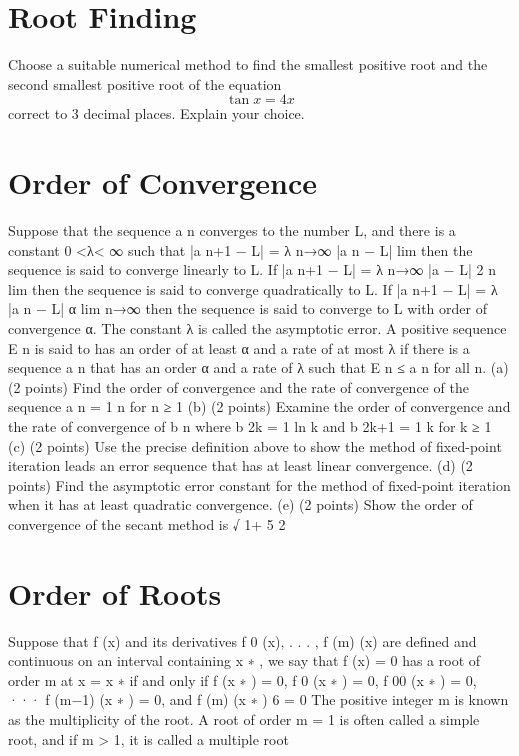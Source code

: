 \section{Root Finding}
Choose a suitable numerical method to find the smallest positive root and the second smallest positive root of the equation
\[ \tan x = 4x \]
correct to 3 decimal places.
Explain your choice.


\section{Order of Convergence}
Suppose that the sequence {a n } converges to the number L, and there is a constant
0 <λ< ∞
such that
|a n+1 − L|
= λ
n→∞ |a n − L|
lim
then the sequence is said to converge linearly to L. If
|a n+1 − L|
= λ
n→∞ |a − L| 2
n
lim
then the sequence is said to converge quadratically to L. If
|a n+1 − L|
= λ
|a n − L| α
lim
n→∞
then the sequence is said to converge to L with order of convergence α. The constant λ is
called the asymptotic error. A positive sequence {E n } is said to has an order of at least α
and a rate of at most λ if there is a sequence {a n } that has an order α and a rate of λ such
that
E n ≤ a n
for all n.
(a) (2 points) Find the order of convergence and the rate of convergence of the sequence
a n =
1
n
for
n ≥ 1
(b) (2 points) Examine the order of convergence and the rate of convergence of {b n } where
b 2k =
1
ln k
and
b 2k+1 =
1
k
for
k ≥ 1
(c) (2 points) Use the precise definition above to show the method of fixed-point iteration
leads an error sequence that has at least linear convergence.
(d) (2 points) Find the asymptotic error constant for the method of fixed-point iteration
when it has at least quadratic convergence.
(e) (2 points) Show the order of convergence of the secant method is
√
1+ 5
2


\section{Order of Roots}
Suppose that f (x) and its derivatives f 0 (x), . . . , f (m) (x) are defined and continuous on an
interval containing x ∗ , we say that f (x) = 0 has a root of order m at x = x ∗ if and only if
f (x ∗ ) = 0,
f 0 (x ∗ ) = 0,
f 00 (x ∗ ) = 0,
···
f (m−1) (x ∗ ) = 0,
and f (m) (x ∗ ) 6 = 0
The positive integer m is known as the multiplicity of the root. A root of order m = 1 is
often called a simple root, and if m > 1, it is called a multiple root


